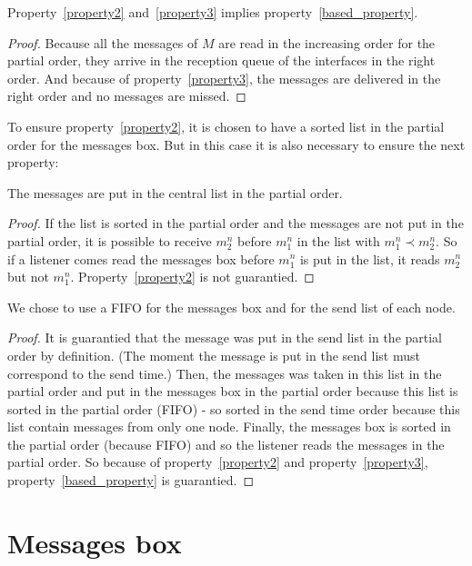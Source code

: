 Property~\ref{property2} and~\ref{property3} implies property~\ref{based_property}.
\begin{proof}
Because all the messages of $M$ are read in the increasing order for the partial order,
they arrive in the reception queue of the interfaces in the right order. And because
of property~\ref{property3}, the messages are delivered in the right order and no 
messages are missed.
\end{proof}

To ensure property~\ref{property2}, it is chosen to have a sorted list in the partial order for the
messages box. But in this case it is also necessary to ensure the next property:
\begin{myproperty}
The messages are put in the central list in the partial order.
\end{myproperty}
\begin{proof}
If the list is sorted in the partial order and the messages are not put in the
partial order, it is possible to receive $m^n_2$ before $m^n_1$ in the list
with $m^n_1\prec m^n_2$. So if a listener comes read the
messages box before $m^n_1$ is put in the list, it reads $m^n_2$ but not $m^n_1$.
Property~\ref{property2} is not guarantied.
\end{proof}

We chose to use a FIFO for the messages box and for the send list of each node.
\begin{proof}
It is guarantied that the message was put in the send list in the partial order by definition.
(The moment the message is put in the send list must correspond to the send time.)
Then, the messages was taken in this list in the partial order and put in the messages box in
the partial order because this list is sorted in the partial order (FIFO) - so sorted in the send time order
because this list contain messages from only one node. Finally, the messages box is
sorted in the partial order (because FIFO) and so the listener reads the messages in
the partial order. So because of property~\ref{property2} and property~\ref{property3}, property~\ref{based_property}
is guarantied.
\end{proof}




\section{Messages box}

